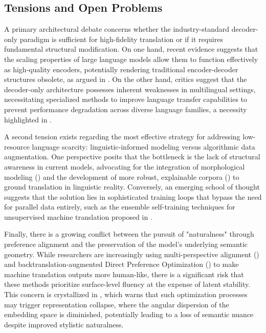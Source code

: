 \documentclass[11pt]{article}
\begin{document}
\subsection{Tensions and Open Problems}

A primary architectural debate concerns whether the industry-standard decoder-only paradigm is sufficient for high-fidelity translation or if it requires fundamental structural modification. On one hand, recent evidence suggests that the scaling properties of large language models allow them to function effectively as high-quality encoders, potentially rendering traditional encoder-decoder structures obsolete, as argued in \citep{2503.06594}. On the other hand, critics suggest that the decoder-only architecture possesses inherent weaknesses in multilingual settings, necessitating specialized methods to improve language transfer capabilities to prevent performance degradation across diverse language families, a necessity highlighted in \citep{2412.02101}.

A second tension exists regarding the most effective strategy for addressing low-resource language scarcity: linguistic-informed modeling versus algorithmic data augmentation. One perspective posits that the bottleneck is the lack of structural awareness in current models, advocating for the integration of morphological modeling (\citep{2404.02392}) and the development of more robust, explainable corpora (\citep{2403.01580}) to ground translation in linguistic reality. Conversely, an emerging school of thought suggests that the solution lies in sophisticated training loops that bypass the need for parallel data entirely, such as the ensemble self-training techniques for unsupervised machine translation proposed in \citep{2603.17087}.

Finally, there is a growing conflict between the pursuit of "naturalness" through preference alignment and the preservation of the model's underlying semantic geometry. While researchers are increasingly using multi-perspective alignment (\citep{2412.08473}) and backtranslation-augmented Direct Preference Optimization (\citep{2604.25702}) to make machine translation outputs more human-like, there is a significant risk that these methods prioritize surface-level fluency at the expense of latent stability. This concern is crystallized in \citep{2602.17287}, which warns that such optimization processes may trigger representation collapse, where the angular dispersion of the embedding space is diminished, potentially leading to a loss of semantic nuance despite improved stylistic naturalness.
\end{document}

